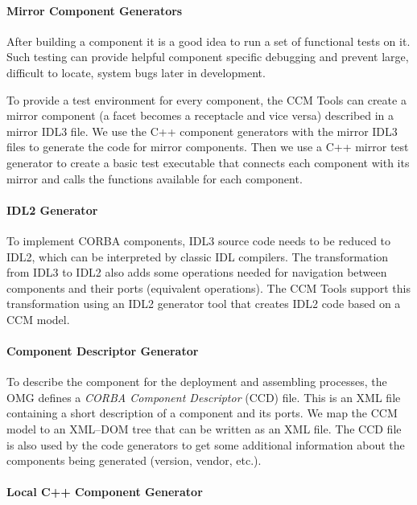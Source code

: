 \paragraph{Mirror Component Generators}

After building a component it is a good idea to run a set of functional tests on
it. Such testing can provide helpful component specific debugging and prevent
large, difficult to locate, system bugs later in development.

To provide a test environment for every component, the CCM Tools can create a
mirror component (a facet becomes a receptacle and vice versa) described in a
mirror IDL3 file. We use the C++ component generators with the mirror IDL3 files
to generate the code for mirror components. Then we use a C++ mirror test
generator to create a basic test executable that connects each component with
its mirror and calls the functions available for each component.

\paragraph{IDL2 Generator}

To implement CORBA components, IDL3 source code needs to be reduced to IDL2,
which can be interpreted by classic IDL compilers. The transformation from IDL3
to IDL2 also adds some operations needed for navigation between components and
their ports (equivalent operations). The CCM Tools support this transformation
using an IDL2 generator tool that creates IDL2 code based on a CCM model.

\paragraph{Component Descriptor Generator}

To describe the component for the deployment and assembling processes, the OMG
defines a {\it CORBA Component Descriptor} (CCD) file. This is an XML file
containing a short description of a component and its ports. We map the CCM
model to an XML--DOM tree that can be written as an XML file. The CCD file is
also used by the code generators to get some additional information about the
components being generated (version, vendor, etc.).

\paragraph{Local C++ Component Generator}

